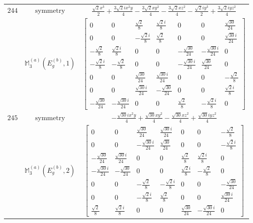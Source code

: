 \documentclass[fleqn,8pt,landscape]{jsarticle}
\begin{document}
\begin{longtable}{ccc}
$ 244 $ & $ \text{symmetry} $ & $ \frac{\sqrt{2} x^{3}}{2} + \frac{3 \sqrt{2} i x^{2} y}{4} - \frac{3 \sqrt{2} x y^{2}}{4} - \frac{3 \sqrt{2} x z^{2}}{4} - \frac{\sqrt{2} i y^{3}}{2} + \frac{3 \sqrt{2} i y z^{2}}{4} $ \\
$  $ & $ \mathbb{M}_{3}^{(a)}(E_{g}^{(b)},1) $ & $ \begin{bmatrix} 0 & 0 & \frac{\sqrt{2}}{8} & \frac{\sqrt{2} i}{8} & 0 & 0 & \frac{\sqrt{30}}{24} \\ 0 & 0 & - \frac{\sqrt{2} i}{8} & \frac{\sqrt{2}}{8} & 0 & 0 & \frac{\sqrt{30} i}{24} \\ - \frac{\sqrt{2}}{8} & \frac{\sqrt{2} i}{8} & 0 & 0 & - \frac{\sqrt{30}}{24} & - \frac{\sqrt{30} i}{24} & 0 \\ - \frac{\sqrt{2} i}{8} & - \frac{\sqrt{2}}{8} & 0 & 0 & - \frac{\sqrt{30} i}{24} & \frac{\sqrt{30}}{24} & 0 \\ 0 & 0 & \frac{\sqrt{30}}{24} & \frac{\sqrt{30} i}{24} & 0 & 0 & - \frac{\sqrt{2}}{8} \\ 0 & 0 & \frac{\sqrt{30} i}{24} & - \frac{\sqrt{30}}{24} & 0 & 0 & \frac{\sqrt{2} i}{8} \\ - \frac{\sqrt{30}}{24} & - \frac{\sqrt{30} i}{24} & 0 & 0 & \frac{\sqrt{2}}{8} & - \frac{\sqrt{2} i}{8} & 0 \end{bmatrix} $ \\ \hline
$ 245 $ & $ \text{symmetry} $ & $ - \frac{\sqrt{30} i x^{2} y}{4} + \frac{\sqrt{30} x y^{2}}{4} - \frac{\sqrt{30} x z^{2}}{4} + \frac{\sqrt{30} i y z^{2}}{4} $ \\
$  $ & $ \mathbb{M}_{3}^{(a)}(E_{g}^{(b)},2) $ & $ \begin{bmatrix} 0 & 0 & \frac{\sqrt{30}}{24} & \frac{\sqrt{30} i}{24} & 0 & 0 & - \frac{\sqrt{2}}{8} \\ 0 & 0 & - \frac{\sqrt{30} i}{24} & \frac{\sqrt{30}}{24} & 0 & 0 & - \frac{\sqrt{2} i}{8} \\ - \frac{\sqrt{30}}{24} & \frac{\sqrt{30} i}{24} & 0 & 0 & \frac{\sqrt{2}}{8} & \frac{\sqrt{2} i}{8} & 0 \\ - \frac{\sqrt{30} i}{24} & - \frac{\sqrt{30}}{24} & 0 & 0 & \frac{\sqrt{2} i}{8} & - \frac{\sqrt{2}}{8} & 0 \\ 0 & 0 & - \frac{\sqrt{2}}{8} & - \frac{\sqrt{2} i}{8} & 0 & 0 & - \frac{\sqrt{30}}{24} \\ 0 & 0 & - \frac{\sqrt{2} i}{8} & \frac{\sqrt{2}}{8} & 0 & 0 & \frac{\sqrt{30} i}{24} \\ \frac{\sqrt{2}}{8} & \frac{\sqrt{2} i}{8} & 0 & 0 & \frac{\sqrt{30}}{24} & - \frac{\sqrt{30} i}{24} & 0 \end{bmatrix} $ \\ \hline

\end{longtable}
\end{document}

